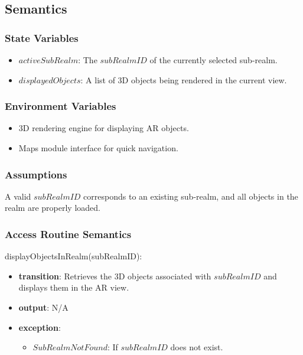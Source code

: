\documentclass[12pt, titlepage]{article}
\begin{document}
\subsection{Semantics}

\subsubsection{State Variables}

\begin{itemize}
  \item \( activeSubRealm \): The \( subRealmID \) of the currently selected sub-realm.
  \item \( displayedObjects \): A list of 3D objects being rendered in the current view.
\end{itemize}

\subsubsection{Environment Variables}

\begin{itemize}
  \item 3D rendering engine for displaying AR objects.
  \item Maps module interface for quick navigation.
\end{itemize}

\subsubsection{Assumptions}

A valid \( subRealmID \) corresponds to an existing sub-realm, and all objects in the realm are properly loaded.

\subsubsection{Access Routine Semantics}

\noindent displayObjectsInRealm(subRealmID):
\begin{itemize}
  \item \textbf{transition}:
        Retrieves the 3D objects associated with \( subRealmID \) and displays them in the AR view.
  \item \textbf{output}: N/A
  \item \textbf{exception}:
        \begin{itemize}
          \item \( SubRealmNotFound \): If \( subRealmID \) does not exist.
        \end{itemize}
\end{itemize}
\end{document}
